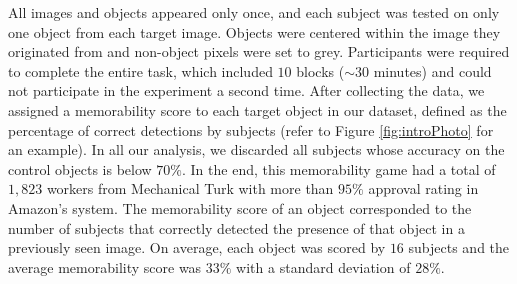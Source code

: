 All images and objects appeared only once, and each subject was tested on only one object from each target image. Objects were centered within the image they originated from and non-object pixels were set to grey. Participants were required to complete the entire task, which included $10$ blocks ($\sim$$30$ minutes) and could not participate in the experiment a second time. After collecting the data, we assigned a memorability score to each target object in our dataset, defined as the percentage of correct detections by subjects (refer to Figure \ref{fig:introPhoto} for an example). In all our analysis, we discarded all subjects whose accuracy on the control objects is below $70\%$. In the end, this memorability game had a total of $1,823$ workers from Mechanical Turk with more than $95\%$ approval rating in Amazon's system. The memorability score of an object corresponded to the number of subjects that correctly detected the presence of that object in a previously seen image. On average, each object was scored by $16$ subjects and the average memorability score was $33\%$ with a standard deviation of $28\%$.
